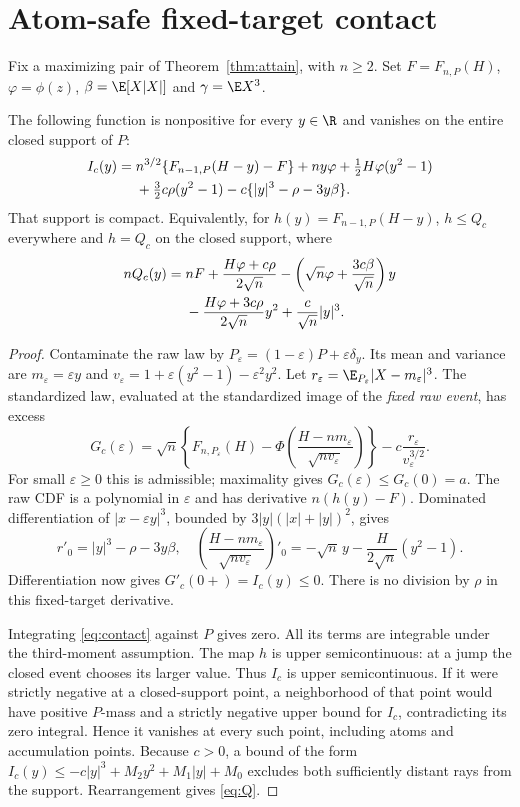 \section{Atom-safe fixed-target contact}
Fix a maximizing pair of Theorem~\ref{thm:attain}, with $n\ge2$. Set
$F=F_{n,P}(H)$, $\varphi=\phi(z)$,
$\beta=\E[X|X|]$ and $\gamma=\E X^3$.
\begin{theorem}\label{thm:contact}
The following function is nonpositive for every $y\in\R$ and vanishes
on the entire closed support of $P$:
\begin{align}
 I_c(y)={}&n^{3/2}\{F_{n-1,P}(H-y)-F\}+ny\varphi
       +\tfrac12 H\varphi(y^2-1)\notag\\
 &+\tfrac32c\rho(y^2-1)-c\{|y|^3-\rho-3y\beta\}.
 \label{eq:contact}
\end{align}
That support is compact. Equivalently, for $h(y)=F_{n-1,P}(H-y)$,
$h\le Q_c$ everywhere and $h=Q_c$ on the closed support, where
\begin{align}
 nQ_c(y)={}&nF+\frac{H\varphi+c\rho}{2\sqrt n}
  -\left(\sqrt n\varphi+\frac{3c\beta}{\sqrt n}\right)y\notag\\
 &-\frac{H\varphi+3c\rho}{2\sqrt n}y^2
  +\frac{c}{\sqrt n}|y|^3.\label{eq:Q}
\end{align}
\end{theorem}
\begin{proof}
Contaminate the raw law by
$P_\varepsilon=(1-\varepsilon)P+\varepsilon\delta_y$. Its mean and variance
are $m_\varepsilon=\varepsilon y$ and
$v_\varepsilon=1+\varepsilon(y^2-1)-\varepsilon^2y^2$.
Let $r_\varepsilon=\E_{P_\varepsilon}|X-m_\varepsilon|^3$. The standardized
law, evaluated at the standardized image of the \emph{fixed raw event},
has excess
\[
 G_c(\varepsilon)=\sqrt n\left\{F_{n,P_\varepsilon}(H)
 -\Phi\!\left(\frac{H-nm_\varepsilon}{\sqrt{nv_\varepsilon}}\right)\right\}
 -c\frac{r_\varepsilon}{v_\varepsilon^{3/2}}.
\]
For small $\varepsilon\ge0$ this is admissible; maximality gives
$G_c(\varepsilon)\le G_c(0)=a$. The raw CDF is a polynomial in
$\varepsilon$ and has derivative $n(h(y)-F)$. Dominated differentiation
of $|x-\varepsilon y|^3$, bounded by
$3|y|(|x|+|y|)^2$, gives
\[
 r'_0=|y|^3-\rho-3y\beta,
 \quad \left(\frac{H-nm_\varepsilon}{\sqrt{nv_\varepsilon}}\right)'_0
 =-\sqrt n\,y-\frac{H}{2\sqrt n}(y^2-1).
\]
Differentiation now gives $G'_c(0+)=I_c(y)\le0$. There is no division by
$\rho$ in this fixed-target derivative.

Integrating \eqref{eq:contact} against $P$ gives zero. All its terms are
integrable under the third-moment assumption. The map $h$ is upper
semicontinuous: at a jump the closed event chooses its larger value.
Thus $I_c$ is upper semicontinuous. If it were strictly negative at a
closed-support point, a neighborhood of that point would have positive
$P$-mass and a strictly negative upper bound for $I_c$, contradicting its
zero integral. Hence it vanishes at every such point, including atoms and
accumulation points. Because $c>0$, a bound of the form
$I_c(y)\le-c|y|^3+M_2y^2+M_1|y|+M_0$ excludes both sufficiently distant
rays from the support. Rearrangement gives \eqref{eq:Q}.
\end{proof}

